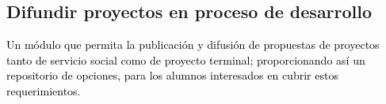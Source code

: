 \documentclass[11pt,letterpaper,titlepage]{article}
\begin{document}



\subsection{Difundir proyectos en proceso de desarrollo}
\textcolor{black}{
Un m\'odulo que permita la publicaci\'on y difusi\'on de propuestas de proyectos tanto de servicio social como de proyecto terminal; proporcionando as\'i un repositorio de opciones, para los alumnos interesados en cubrir estos requerimientos.}

\end{document}
